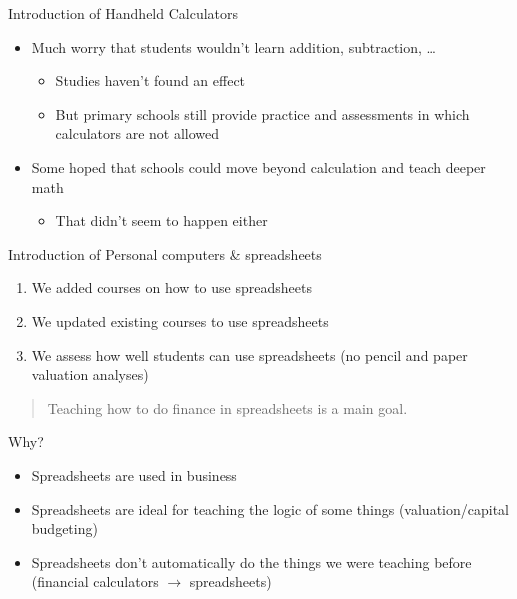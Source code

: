 \documentclass[
  ignorenonframetext,
]{beamer}
\providecommand{\tightlist}{%
  \setlength{\itemsep}{0pt}\setlength{\parskip}{0pt}}\usepackage{longtable,booktabs,array}
\begin{document}
\begin{frame}{Introduction of Handheld Calculators}
\label{introduction-of-handheld-calculators}
\begin{itemize}
\tightlist
\item
  Much worry that students wouldn't learn addition, subtraction,
  \ldots{}

  \begin{itemize}
  \tightlist
  \item
    Studies haven't found an effect
  \item
    But primary schools still provide practice and assessments in which
    calculators are not allowed
  \end{itemize}
\item
  Some hoped that schools could move beyond calculation and teach deeper
  math

  \begin{itemize}
  \tightlist
  \item
    That didn't seem to happen either
  \end{itemize}
\end{itemize}
\end{frame}

\begin{frame}{Introduction of Personal computers \& spreadsheets}
\label{introduction-of-personal-computers-spreadsheets}
\begin{enumerate}
\tightlist
\item
  We added courses on how to use spreadsheets
\item
  We updated existing courses to use spreadsheets
\item
  We assess how well students can use spreadsheets (no pencil and paper
  valuation analyses)
\end{enumerate}

\begin{quote}
Teaching how to do finance in spreadsheets is a main goal.
\end{quote}
\end{frame}

\begin{frame}{Why?}
\label{why}
\begin{itemize}
\tightlist
\item
  Spreadsheets are used in business
\item
  Spreadsheets are ideal for teaching the logic of some things
  (valuation/capital budgeting)
\item
  Spreadsheets don't automatically do the things we were teaching before
  (financial calculators \(\rightarrow\) spreadsheets)
\end{itemize}
\end{frame}
\end{document}
